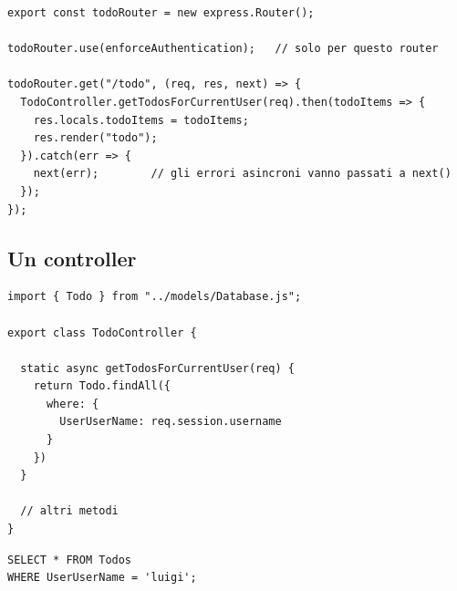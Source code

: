 \begin{affianco}[0.58][c]
\codicepiccolo
\begin{lstlisting}[style=js, name=routes/todoRouter.js]
export const todoRouter = new express.Router();

todoRouter.use(enforceAuthentication);   // solo per questo router

todoRouter.get("/todo", (req, res, next) => {
  TodoController.getTodosForCurrentUser(req).then(todoItems => {
    res.locals.todoItems = todoItems;
    res.render("todo");
  }).catch(err => {
    next(err);        // gli errori asincroni vanno passati a next()
  });
});
\end{lstlisting}
\risultato
\begin{immagine}
\end{immagine}
\end{affianco}

\subsection{Un controller}

\begin{affianco}[0.55][c]
\begin{lstlisting}[style=js, name=controllers/TodoController.js]
import { Todo } from "../models/Database.js";

export class TodoController {

  static async getTodosForCurrentUser(req) {
    return Todo.findAll({
      where: {
        UserUserName: req.session.username
      }
    })
  }

  // altri metodi
}
\end{lstlisting}
\risultato
\begin{lstlisting}[style=sql, name=query generata]
SELECT * FROM Todos
WHERE UserUserName = 'luigi';
\end{lstlisting}
\end{affianco}

